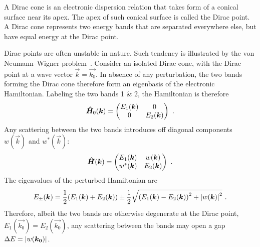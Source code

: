 ﻿A Dirac cone is an electronic dispersion relation that takes form of a conical surface near its apex. The apex of such conical surface is called the Dirac point. A Dirac cone represents two energy bands that are separated everywhere else, but have equal energy at the Dirac point.

Dirac points are often unstable in nature. Such tendency is illustrated by the von Neumann--Wigner problem~\cite{vonNeumann1993, Asano2011}. Consider an isolated Dirac cone, with the Dirac point at a wave vector $\vec{k}=\vec{k_0}$. In absence of any perturbation, the two bands forming the Dirac cone therefore form an eigenbasis of the electronic Hamiltonian. Labeling the two bands 1 \& 2, the Hamiltonian is therefore%
\begin{equation}
    \op{H}_0(\vec{k}) = %
        \begin{pmatrix}
            E_1(\vec{k}) & 0\\
            0 & E_2(\vec{k})
        \end{pmatrix}~.
\end{equation}%
Any scattering between the two bands introduces off diagonal components $w(\vec{k})$ and $w^*(\vec{k})$:%
\begin{equation}
    \op{H}(\vec{k}) = %
        \begin{pmatrix}
            E_1(\vec{k}) & w(\vec{k})\\
            w^*(\vec{k}) & E_2(\vec{k})
        \end{pmatrix}~.
\end{equation}%
The eigenvalues of the perturbed Hamiltonian are
\begin{equation}
    E_\pm(\vec{k}) = \frac{1}{2} \qty(E_1(\vec{k}) + E_2(\vec{k})) \pm \frac{1}{2} \sqrt{\qty(E_1(\vec{k}) - E_2(\vec{k}))^2 + \abs{w(\vec{k})}^2}~.
\end{equation}
Therefore, albeit the two bands are otherwise degenerate at the Dirac point, $E_1(\vec{k_0}) = E_2(\vec{k_0})$, any scattering between the bands may open a gap $\Delta{}E = \abs{w(\vec{k_0})}$.

